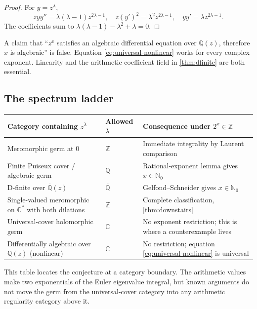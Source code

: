 \documentclass[11pt,oneside]{article}
\theoremstyle{definition}
\theoremstyle{remark}
\newcommand{\Nzero}{\mathbb N_0}
\newcommand{\Z}{\mathbb Z}
\newcommand{\Q}{\mathbb Q}
\newcommand{\C}{\mathbb C}
\newcommand{\Qbar}{\overline{\mathbb Q}}
\begin{document}
\begin{proof}
For \(y=z^\lambda\),
\[
  zyy''=\lambda(\lambda-1)z^{2\lambda-1},\quad
  z(y')^2=\lambda^2z^{2\lambda-1},\quad
  yy'=\lambda z^{2\lambda-1}.
\]
The coefficients sum to \(\lambda(\lambda-1)-\lambda^2+\lambda=0\).
\end{proof}

\begin{auditbox}
A claim that ``\(z^x\) satisfies an algebraic differential equation over \(\Q(z)\), therefore \(x\) is algebraic'' is false.  Equation \eqref{eq:universal-nonlinear} works for every complex exponent.  Linearity and the arithmetic coefficient field in \cref{thm:dfinite} are both essential.
\end{auditbox}

\subsection{The spectrum ladder}

\begin{center}
\renewcommand{\arraystretch}{1.25}
\begin{tabularx}{0.98\textwidth}{>{\raggedright\arraybackslash}p{} >{\centering\arraybackslash}p{} X}
\toprule
\textbf{Category containing \(z^\lambda\)} & \textbf{Allowed \(\lambda\)} & \textbf{Consequence under \(2^x\in\Z\)}\\
\midrule
Meromorphic germ at \(0\) & \(\Z\) & Immediate integrality by Laurent comparison\\
Finite Puiseux cover / algebraic germ & \(\Q\) & Rational-exponent lemma gives \(x\in\Nzero\)\\
D-finite over \(\Qbar(z)\) & \(\Qbar\) & Gelfond--Schneider gives \(x\in\Nzero\)\\
Single-valued meromorphic on \(\C^*\) with both dilations & \(\Z\) & Complete classification, \cref{thm:downstairs}\\
Universal-cover holomorphic germ & \(\C\) & No exponent restriction; this is where a counterexample lives\\
Differentially algebraic over \(\Q(z)\) (nonlinear) & \(\C\) & No restriction; equation \eqref{eq:universal-nonlinear} is universal\\
\bottomrule
\end{tabularx}
\end{center}

This table locates the conjecture at a category boundary.  The arithmetic values make two exponentials of the Euler eigenvalue integral, but known arguments do not move the germ from the universal-cover category into any arithmetic regularity category above it.
\end{document}
